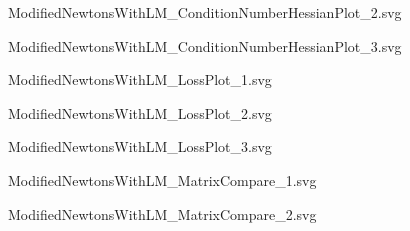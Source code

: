 \documentclass{article}
\begin{document}
    \begin{figure}[H]
        \centering
        
        \caption{ModifiedNewtonsWithLM_ConditionNumberHessianPlot_2.svg}
        \label{fig:ModifiedNewtonsWithLM_ConditionNumberHessianPlot_2.svg}
    \end{figure}
    
    \begin{figure}[H]
        \centering
        
        \caption{ModifiedNewtonsWithLM_ConditionNumberHessianPlot_3.svg}
        \label{fig:ModifiedNewtonsWithLM_ConditionNumberHessianPlot_3.svg}
    \end{figure}
    
    \begin{figure}[H]
        \centering
        
        \caption{ModifiedNewtonsWithLM_LossPlot_1.svg}
        \label{fig:ModifiedNewtonsWithLM_LossPlot_1.svg}
    \end{figure}
    
    \begin{figure}[H]
        \centering
        
        \caption{ModifiedNewtonsWithLM_LossPlot_2.svg}
        \label{fig:ModifiedNewtonsWithLM_LossPlot_2.svg}
    \end{figure}
    
    \begin{figure}[H]
        \centering
        
        \caption{ModifiedNewtonsWithLM_LossPlot_3.svg}
        \label{fig:ModifiedNewtonsWithLM_LossPlot_3.svg}
    \end{figure}
    
    \begin{figure}[H]
        \centering
        
        \caption{ModifiedNewtonsWithLM_MatrixCompare_1.svg}
        \label{fig:ModifiedNewtonsWithLM_MatrixCompare_1.svg}
    \end{figure}
    
    \begin{figure}[H]
        \centering
        
        \caption{ModifiedNewtonsWithLM_MatrixCompare_2.svg}
        \label{fig:ModifiedNewtonsWithLM_MatrixCompare_2.svg}
    \end{figure}
    
\end{document}
